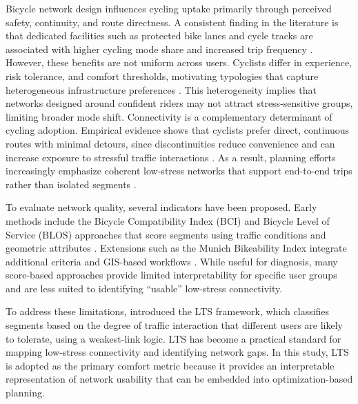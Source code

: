 \documentclass[preprint,authoryear,10pt]{elsarticle}
\begin{document}
Bicycle network design influences cycling uptake primarily through perceived safety, continuity, and route directness. A consistent finding in the literature is that dedicated facilities such as protected bike lanes and cycle tracks are associated with higher cycling mode share and increased trip frequency \citep{mitra2017Modesubstitutioneffect, dill2003BicycleCommutingFacilities, buehler2012Cyclingwork90}. However, these benefits are not uniform across users. Cyclists differ in experience, risk tolerance, and comfort thresholds, motivating typologies that capture heterogeneous infrastructure preferences \citep{dill2013FourTypesCyclists, damant-sirois2014WhatsYourType}. This heterogeneity implies that networks designed around confident riders may not attract stress-sensitive groups, limiting broader mode shift. Connectivity is a complementary determinant of cycling adoption. Empirical evidence shows that cyclists prefer direct, continuous routes with minimal detours, since discontinuities reduce convenience and can increase exposure to stressful traffic interactions \citep{schoner2014missinglinkbicycle, fitch2022Whatmakesbicyclists, dill2009BicyclingTransportationHealth, reggiani2022Understandingbikeabilitymethodology}. As a result, planning efforts increasingly emphasize coherent low-stress networks that support end-to-end trips rather than isolated segments \citep{rayfield2011Connectivityconservationframework}.

To evaluate network quality, several indicators have been proposed. Early methods include the Bicycle Compatibility Index (BCI) \citep{harkey1998DevelopmentBicycleCompatibility} and Bicycle Level of Service (BLOS) approaches that score segments using traffic conditions and geometric attributes \citep{jensen2007PedestrianBicyclistLevel, petritsch2007BicycleLevelService}. Extensions such as the Munich Bikeability Index integrate additional criteria and GIS-based workflows \citep{schmid-querg2021MunichBikeabilityIndex}. While useful for diagnosis, many score-based approaches provide limited interpretability for specific user groups and are less suited to identifying ``usable'' low-stress connectivity.

To address these limitations, \citet{mekuria_low-stress_2012} introduced the LTS framework, which classifies segments based on the degree of traffic interaction that different users are likely to tolerate, using a weakest-link logic. LTS has become a practical standard for mapping low-stress connectivity and identifying network gaps. In this study, LTS is adopted as the primary comfort metric because it provides an interpretable representation of network usability that can be embedded into optimization-based planning.
\end{document}
